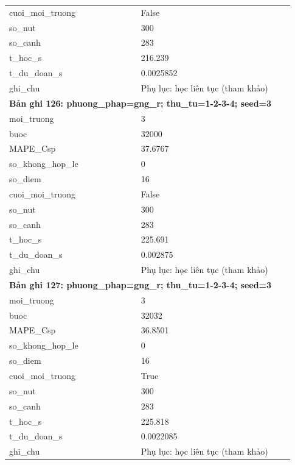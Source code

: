 \begin{longtable}{p{0.43\linewidth}p{0.50\linewidth}}
cuoi\_\allowbreak moi\_\allowbreak truong & False \\
so\_\allowbreak nut & 300 \\
so\_\allowbreak canh & 283 \\
t\_\allowbreak hoc\_\allowbreak s & 216.239 \\
t\_\allowbreak du\_\allowbreak doan\_\allowbreak s & 0.0025852 \\
ghi\_\allowbreak chu & Phụ lục: học liên tục (tham khảo) \\
\midrule
\multicolumn{2}{p{0.95\linewidth}}{\textbf{Bản ghi 126: phuong\_phap=gng\_r; thu\_tu=1-2-3-4; seed=3}} \\
moi\_\allowbreak truong & 3 \\
buoc & 32000 \\
MAPE\_\allowbreak Csp & 37.6767 \\
so\_\allowbreak khong\_\allowbreak hop\_\allowbreak le & 0 \\
so\_\allowbreak diem & 16 \\
cuoi\_\allowbreak moi\_\allowbreak truong & False \\
so\_\allowbreak nut & 300 \\
so\_\allowbreak canh & 283 \\
t\_\allowbreak hoc\_\allowbreak s & 225.691 \\
t\_\allowbreak du\_\allowbreak doan\_\allowbreak s & 0.002875 \\
ghi\_\allowbreak chu & Phụ lục: học liên tục (tham khảo) \\
\midrule
\multicolumn{2}{p{0.95\linewidth}}{\textbf{Bản ghi 127: phuong\_phap=gng\_r; thu\_tu=1-2-3-4; seed=3}} \\
moi\_\allowbreak truong & 3 \\
buoc & 32032 \\
MAPE\_\allowbreak Csp & 36.8501 \\
so\_\allowbreak khong\_\allowbreak hop\_\allowbreak le & 0 \\
so\_\allowbreak diem & 16 \\
cuoi\_\allowbreak moi\_\allowbreak truong & True \\
so\_\allowbreak nut & 300 \\
so\_\allowbreak canh & 283 \\
t\_\allowbreak hoc\_\allowbreak s & 225.818 \\
t\_\allowbreak du\_\allowbreak doan\_\allowbreak s & 0.0022085 \\
ghi\_\allowbreak chu & Phụ lục: học liên tục (tham khảo) \\

\end{longtable}
